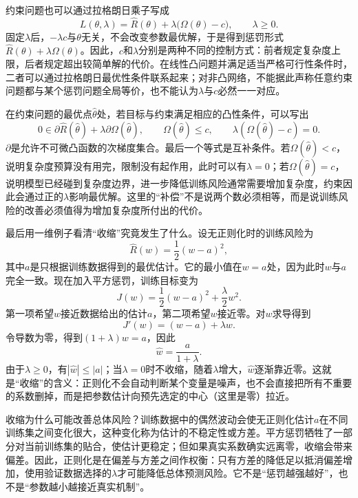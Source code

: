 约束问题也可以通过拉格朗日乘子写成
\begin{equation}
 L(\theta,\lambda)=\hat R(\theta)+\lambda\bigl(\Omega(\theta)-c\bigr),\qquad \lambda\geq0.
\end{equation}
固定$\lambda$后，$-\lambda c$与$\theta$无关，不会改变参数最优解，于是得到惩罚形式$\hat R(\theta)+\lambda\Omega(\theta)$。因此，$c$和$\lambda$分别是两种不同的控制方式：前者规定复杂度上限，后者规定超出较简单解的代价。在线性凸问题并满足适当严格可行性条件时，二者可以通过拉格朗日最优性条件联系起来；对非凸网络，不能据此声称任意约束问题都与某个惩罚问题全局等价，也不能认为$\lambda$与$c$必然一一对应。

在约束问题的最优点$\hat\theta$处，若目标与约束满足相应的凸性条件，可以写出
\begin{equation}
 0\in\partial\hat R(\hat\theta)+\lambda\partial\Omega(\hat\theta),\qquad
 \Omega(\hat\theta)\leq c,\qquad
 \lambda(\Omega(\hat\theta)-c)=0.
\end{equation}
$\partial$是允许不可微凸函数的次梯度集合。最后一个等式是互补条件。若$\Omega(\hat\theta)<c$，说明复杂度预算没有用完，限制没有起作用，此时可以有$\lambda=0$；若$\Omega(\hat\theta)=c$，说明模型已经碰到复杂度边界，进一步降低训练风险通常需要增加复杂度，约束因此会通过正的$\lambda$影响最优解。这里的“补偿”不是说两个数必须相等，而是说训练风险的改善必须值得为增加复杂度所付出的代价。

最后用一维例子看清“收缩”究竟发生了什么。设无正则化时的训练风险为
\begin{equation}
 \hat R(w)=\frac12(w-a)^2,
\end{equation}
其中$a$是只根据训练数据得到的最优估计。它的最小值在$w=a$处，因为此时$w$与$a$完全一致。现在加入平方惩罚，训练目标变为
\begin{equation}
 J(w)=\frac12(w-a)^2+\frac{\lambda}{2}w^2.
\end{equation}
第一项希望$w$接近数据给出的估计$a$，第二项希望$w$接近零。对$w$求导得到
\begin{equation}
 J'(w)=(w-a)+\lambda w.
\end{equation}
令导数为零，得到$(1+\lambda)w=a$，因此
\begin{equation}
 \hat w=\frac{a}{1+\lambda}.
\end{equation}
由于$\lambda\geq0$，有$|\hat w|\leq|a|$；当$\lambda=0$时不收缩，随着$\lambda$增大，$\hat w$逐渐靠近零。这就是“收缩”的含义：正则化不会自动判断某个变量是噪声，也不会直接把所有不重要的系数删掉，而是把参数估计向预先选定的中心（这里是零）拉近。

收缩为什么可能改善总体风险？训练数据中的偶然波动会使无正则化估计$a$在不同训练集之间变化很大，这种变化称为估计的不稳定性或方差。平方惩罚牺牲了一部分对当前训练集的贴合，使估计更稳定；但如果真实系数确实远离零，收缩会带来偏差。因此，正则化是在偏差与方差之间作权衡：只有方差的降低足以抵消偏差增加，使用验证数据选择的$\lambda$才可能降低总体预测风险。它不是“惩罚越强越好”，也不是“参数越小越接近真实机制”。

